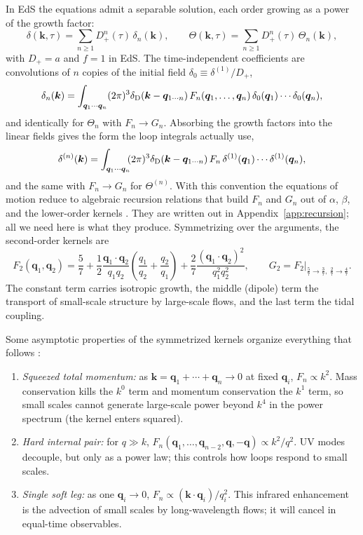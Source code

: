 \documentclass[a4paper,11pt]{article}
\newcommand{\vq}{\bm{q}}
\newcommand{\vk}{\bm{k}}
\def\dirac{\delta_{\rm D}}
\numberwithin{equation}{section}
\begin{document}
In EdS the equations admit a separable solution, each order growing as a power of the growth factor:
\begin{equation}
\delta(\vk,\tau) = \sum_{n\ge1} D_+^n(\tau)\,\delta_n(\vk),
\qquad
\Theta(\vk,\tau) = \sum_{n\ge1} D_+^n(\tau)\,\Theta_n(\vk) ,
\label{eq:eds_ansatz}
\end{equation}
with $D_+ = a$ and $f=1$ in EdS. The time-independent coefficients are convolutions of $n$ copies of the initial field $\delta_0 \equiv \delta^{(1)}/D_+$,
\begin{equation}
\delta_n(\vk) = \int_{\vq_1\cdots\vq_n}
(2\pi)^3\dirac(\vk - \vq_{1\cdots n})\,
F_n(\vq_1,\ldots,\vq_n)\,
\delta_0(\vq_1)\cdots\delta_0(\vq_n) ,
\label{eq:Fn_def}
\end{equation}
and identically for $\Theta_n$ with $F_n \to G_n$. Absorbing the growth factors into the linear fields gives the form the loop integrals actually use,
\begin{equation}
\delta^{(n)}(\vk) = \int_{\vq_1\cdots\vq_n}\!\!(2\pi)^3\dirac(\vk-\vq_{1\cdots n})\,F_n\,
\delta^{(1)}(\vq_1)\cdots\delta^{(1)}(\vq_n) ,
\label{eq:Fn_def_alt}
\end{equation}
and the same with $F_n\to G_n$ for $\Theta^{(n)}$. With this convention the equations of motion reduce to algebraic recursion relations that build $F_n$ and $G_n$ out of $\alpha$, $\beta$, and the lower-order kernels \cite[Eqs.~(43)--(44)]{Bernardeau2002}. They are written out in Appendix~\ref{app:recursion}; all we need here is what they produce. Symmetrizing over the arguments, the second-order kernels are
\begin{equation}
\boxed{\;
F_2(\vq_1,\vq_2) = \frac{5}{7}
+ \frac{1}{2}\frac{\vq_1\cdot\vq_2}{q_1q_2}\left(\frac{q_1}{q_2}+\frac{q_2}{q_1}\right)
+ \frac{2}{7}\frac{(\vq_1\cdot\vq_2)^2}{q_1^2q_2^2},
\qquad
G_2 = F_2\Big|_{\frac57\to\frac37,\ \frac27\to\frac47} .\;}
\label{eq:F2G2}
\end{equation}
The constant term carries isotropic growth, the middle (dipole) term the transport of small-scale structure by large-scale flows, and the last term the tidal coupling.

Some asymptotic properties of the symmetrized kernels organize everything that follows \cite[\S 2.4]{Bernardeau2002}:
\begin{enumerate}[itemsep=1pt,topsep=2pt]
\item \emph{Squeezed total momentum:} as $\vk = \vq_1+\cdots+\vq_n \to 0$ at fixed $\vq_i$, $F_n \propto k^2$. Mass conservation kills the $k^0$ term and momentum conservation the $k^1$ term, so small scales cannot generate large-scale power beyond $k^4$ in the power spectrum (the kernel enters squared).
\item \emph{Hard internal pair:} for $q \gg k$, $F_n(\vq_1,\ldots,\vq_{n-2},\vq,-\vq) \propto k^2/q^2$. UV modes decouple, but only as a power law; this controls how loops respond to small scales.
\item \emph{Single soft leg:} as one $\vq_i \to 0$, $F_n \propto (\vk\cdot\vq_i)/q_i^2$. This infrared enhancement is the advection of small scales by long-wavelength flows; it will cancel in equal-time observables.
\end{enumerate}
\end{document}
